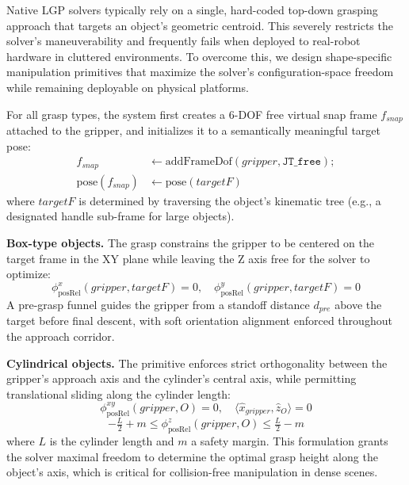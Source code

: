 \documentclass[journal]{IEEEtran}
\begin{document}
  Native LGP solvers typically rely on a single, hard-coded top-down grasping
  approach that targets an object's geometric centroid. This severely restricts the
  solver's maneuverability and frequently fails when deployed to real-robot
  hardware in cluttered environments. To overcome this, we design shape-specific
  manipulation primitives that maximize the solver's configuration-space freedom
  while remaining deployable on physical platforms.

  For all grasp types, the system first creates a 6-DOF free virtual snap frame
  $f_{snap}$ attached to the gripper, and initializes it to a semantically
  meaningful target pose:
  \begin{equation}
    \begin{split}
      f_{snap} &\leftarrow \text{addFrameDof}(gripper, \texttt{JT\_free}); \\
      \text{pose}(f_{snap}) &\leftarrow \text{pose}(targetF)
    \end{split}
    \label{eq:snap_frame}
  \end{equation}
  where $targetF$ is determined by traversing the object's kinematic tree (e.g., a
  designated handle sub-frame for large objects).

  \textbf{Box-type objects.}
  The grasp constrains the gripper to be centered on the target frame in the XY
  plane while leaving the Z axis free for the solver to optimize:
  \begin{equation}
    \phi_{\text{posRel}}^{x}(gripper, targetF) = 0, \quad
    \phi_{\text{posRel}}^{y}(gripper, targetF) = 0
    \label{eq:pick_box}
  \end{equation}
  A pre-grasp funnel guides the gripper from a standoff distance $d_{pre}$ above
  the target before final descent, with soft orientation alignment enforced
  throughout the approach corridor.

  \textbf{Cylindrical objects.}
  The primitive enforces strict orthogonality between the gripper's approach axis
  and the cylinder's central axis, while permitting translational sliding along
  the cylinder length:
  \begin{equation}
    \phi_{\text{posRel}}^{xy}(gripper, O) = 0, \quad
    \langle \hat{x}_{gripper}, \hat{z}_{O} \rangle = 0
    \label{eq:pick_cyl_axis}
  \end{equation}
  \begin{equation}
    -\tfrac{L}{2} + m \leq \phi_{\text{posRel}}^{z}(gripper, O)
    \leq \tfrac{L}{2} - m
    \label{eq:pick_cyl_slide}
  \end{equation}
  where $L$ is the cylinder length and $m$ a safety margin. This formulation grants
  the solver maximal freedom to determine the optimal grasp height along the
  object's axis, which is critical for collision-free manipulation in dense scenes.
\end{document}
